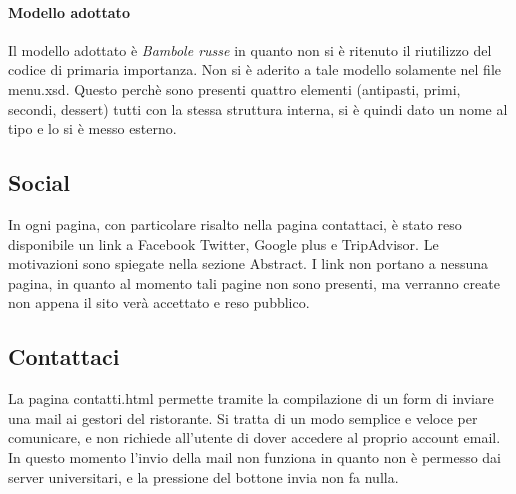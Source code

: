 \paragraph{Modello adottato}
Il modello adottato è \emph{Bambole russe} in quanto non si è ritenuto il riutilizzo del codice di primaria importanza.
Non si è aderito a tale modello solamente nel file menu.xsd. Questo perchè sono presenti quattro elementi (antipasti, primi, secondi, dessert) tutti con la stessa struttura interna, si è quindi dato un nome al tipo e lo si è messo esterno.

\subsection{Social}
In ogni pagina, con particolare risalto nella pagina contattaci, è stato reso disponibile un link a Facebook Twitter, Google plus e TripAdvisor. Le motivazioni sono spiegate nella sezione Abstract.
I link non portano a nessuna pagina, in quanto al momento tali pagine non sono presenti, ma verranno create non appena il sito verà accettato e reso pubblico.

\subsection{Contattaci}
La pagina contatti.html permette tramite la compilazione di un form di inviare una mail ai gestori del ristorante.
Si tratta di un modo semplice e veloce per comunicare, e non richiede all'utente di dover accedere al proprio account email. 
In questo momento l'invio della mail non funziona in quanto non è permesso dai server universitari, e la pressione del bottone invia non fa nulla.

